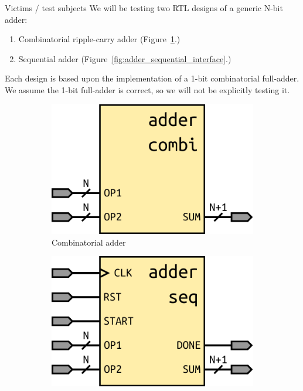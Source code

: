 \documentclass[lab]{course}
\begin{document}
\begin{section}{Victims / test subjects}
    We will be testing two RTL designs of a generic N-bit adder:

    \begin{enumerate}
        \item Combinatorial ripple-carry adder (Figure~\ref{fig:adder_combinatorial_interface}.)
        \item Sequential adder (Figure~\ref{fig:adder_sequential_interface}.)
    \end{enumerate}

    Each design is based upon the implementation of a 1-bit combinatorial full-adder. We assume the 1-bit full-adder is correct, so we will not be explicitly testing it. \\

    \begin{figure}[!h]
        \centering
        \begin{subfigure}[t]{0.3\textwidth}
            \centering
            \includegraphics[width=1.0\textwidth]{figs/adder_combinatorial_interface.pdf}
            \caption{Combinatorial adder}
            \label{fig:adder_combinatorial_interface}
        \end{subfigure}
        \hspace{1em}
        \begin{subfigure}[t]{0.3\textwidth}
            \centering
            \includegraphics[width=1.0\textwidth]{figs/adder_sequential_interface.pdf}

\end{subfigure}
\end{figure}
\end{section}
\end{document}
